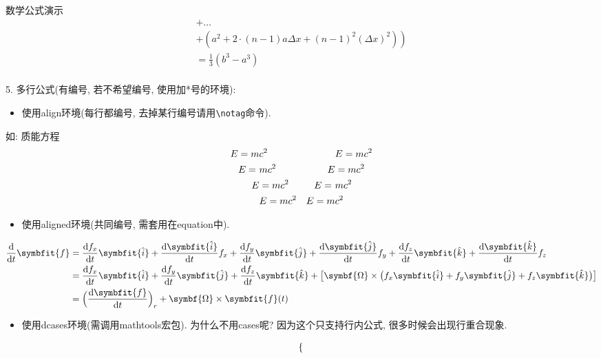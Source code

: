 \documentclass[hyperref,UTF8,11pt]{beamer}
\begin{document}
\begin{frame}{数学公式演示}
\begin{multline}
			+\ldots\\
			\left.+\left(a^{2}+2\cdot(n-1)a\Delta x+(n-1)^{2}\left(\Delta x\right)^{2}\right)\right)\\
			=\frac{1}{3}\left(b^{3}-a^{3}\right)
		\end{multline}\\[1ex]
	\pagebreak
	{\color{JXred}5. 多行公式(有编号, 若不希望编号, 使用加*号的环境):}
	\begin{itemize}
		\item 使用align环境(每行都编号, 去掉某行编号请用\verb|\notag|命令).
	\end{itemize}
	如: 质能方程
		\begin{align}
			E=m&c^2 & &E=mc^2\\
			E=~&mc^2 & E&=mc^2 \notag \\
			E&=mc^2 & E=~&mc^2\\
			&E=mc^2 & E=m&c^2
		\end{align}
	\begin{itemize}
		\item 使用aligned环境(共同编号, 需套用在equation中).
	\end{itemize}
		\begin{equation}
			\begin{aligned}
			\dfrac{\mathrm{d}}{\mathrm{d}t} \symbfit{f} &= \dfrac{\mathrm{d}f_x}{\mathrm{d}t} \symbfit{\hat{i}} + \dfrac{\mathrm{d}\symbfit{\hat{i}}}{\mathrm{d}t} f_x + \dfrac{\mathrm{d}f_y}{\mathrm{d}t} \symbfit{\hat{j}} + \dfrac{\mathrm{d}\symbfit{\hat{j}}}{\mathrm{d}t} f_y + \dfrac{\mathrm{d}f_z}{\mathrm{d}t} \symbfit{\hat{k}} + \dfrac{\mathrm{d}\symbfit{\hat{k}}}{\mathrm{d}t} f_z \\
			&= \dfrac{\mathrm{d}f_x}{\mathrm{d}t} \symbfit{\hat{i}} + \dfrac{\mathrm{d}f_y}{\mathrm{d}t} \symbfit{\hat{j}} + \dfrac{\mathrm{d}f_z}{\mathrm{d}t} \symbfit{\hat{k}} + \big[\symbf{\Omega} \times \big( f_x \symbfit{\hat{i}} + f_y \symbfit{\hat{j}} + f_z \symbfit{\hat{k}}\big) \big] \\
			&= \Big(\dfrac{\mathrm{d}\symbfit{f}}{\mathrm{d}t}\Big)_r + \symbf{\Omega} \times \symbfit{f}(t)
			\end{aligned}
		\end{equation}
	\begin{itemize}
		\item 使用dcases环境(需调用mathtools宏包). 为什么不用cases呢? 因为这个只支持行内公式, 很多时候会出现行重合现象.
	\end{itemize}
		\begin{equation}
			\begin{dcases}

\end{dcases}
\end{equation}
\end{frame}
\end{document}
